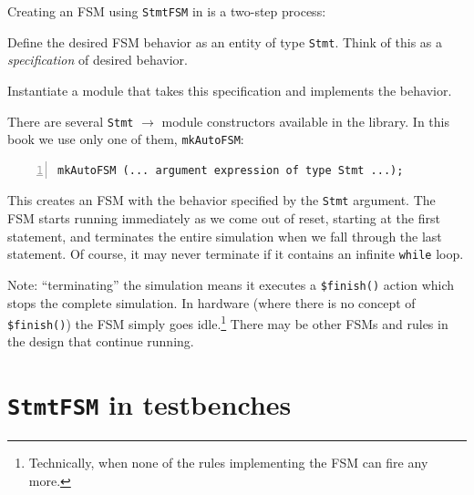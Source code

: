 \label{Sec_AutoFSM}


Creating an FSM using \verb|StmtFSM| in {\BSV} is a two-step process:

\begin{tightlist}

 \item Define the desired FSM behavior as an entity of type
       \verb|Stmt|.  Think of this as a \emph{specification} of
       desired behavior.

 \item Instantiate a module that takes this specification and
       implements the behavior.

\end{tightlist}

There are several \verb|Stmt| $\longrightarrow$ module constructors
available in the {\BSV} library.  In this book we use only one of them,
\verb|mkAutoFSM|:

{\footnotesize
\begin{Verbatim}[frame=single, numbers=left]
   mkAutoFSM (... argument expression of type Stmt ...);
\end{Verbatim}
}

This creates an FSM with the behavior specified by the \verb|Stmt|
argument.  The FSM starts running immediately as we come out of reset,
starting at the first statement, and terminates the entire simulation
when we fall through the last statement.  Of course, it may never
terminate if it contains an infinite {\tt while} loop.

Note: ``terminating'' the simulation means it executes a
\verb|$finish()| action which stops the complete simulation.  In
hardware (where there is no concept of \verb|$finish()|) the FSM
simply goes idle.\footnote{Technically, when none of the rules implementing
the FSM can fire any more.}  There may be other FSMs and rules in the
design that continue running.


\section{{\tt StmtFSM} in testbenches}

\label{Sec_StmtFSM_in_testbenches}

